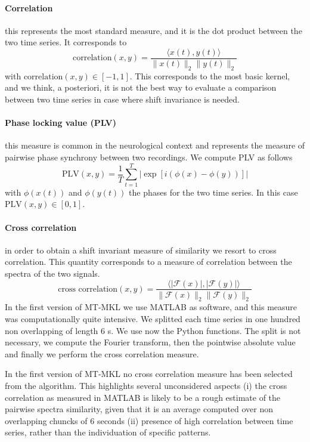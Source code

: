 \documentclass[a4paper]{article}
\begin{document}
\paragraph{Correlation} this represents the most standard measure, and it is the dot product between the two time series. It corresponds to
\begin{equation}
  \text{correlation}(x,y) = \frac{\langle x(t), y(t) \rangle}{\| x(t) \|_2 \| y(t) \|_2}
\end{equation}
with $\text{correlation}(x,y)\in [-1,1]$. This corresponds to the most basic kernel, and we think, a posteriori, it is not the best way to evaluate a comparison between two time series in case where shift invariance is needed.

\paragraph{Phase locking value (PLV)} this measure is common in the neurological context and represents the measure of pairwise phase synchrony between two recordings. We compute PLV as follows
\begin{equation}
 \text{PLV}(x,y) = \frac{1}{T}\sum_{t=1}^T |\exp[i (\phi(x) -\phi(y))]|
\end{equation}
with $\phi(x(t))$ and $\phi(y(t))$ the phases for the two time series.
In this case $\text{PLV}(x,y)\in [0,1]$.

\paragraph{Cross correlation} in order to obtain a shift invariant measure of similarity we resort to cross correlation. This quantity corresponds to a measure of correlation between the spectra of the two signals.
\begin{equation}
  \text{cross correlation}(x,y) = \frac{\langle|\mathcal{F}(x)|, |\mathcal{F}(y)| \rangle}{\|\mathcal{F}(x)\|_2 \|\mathcal{F}(y)\|_2}
\end{equation}
In the first version of MT-MKL we use MATLAB as software, and this measure was computationally quite intensive. We splitted each time series in one hundred non overlapping of length 6 s. We use now the Python functions. The split is not necessary, we compute the Fourier transform, then the pointwise absolute value and finally we perform the cross correlation measure.


In the first version of MT-MKL no cross correlation measure has been selected from the algorithm. This highlights several  unconsidered aspects (i) the cross correlation as measured in MATLAB is likely to be a rough estimate of the pairwise spectra similarity, given that it is an average computed over non overlapping chuncks of 6 seconds (ii) presence of high correlation between time series, rather than the individuation of specific patterns.
\end{document}
